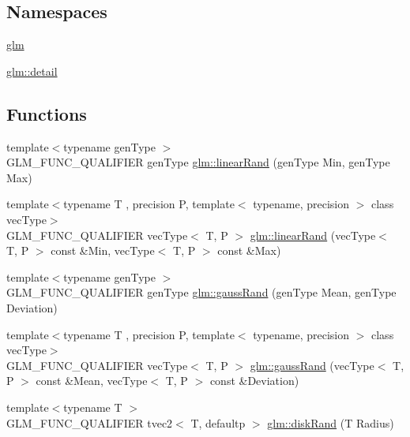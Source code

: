 \subsection*{Namespaces}
\begin{DoxyCompactItemize}
\item 
 \hyperlink{namespaceglm}{glm}
\item 
 \hyperlink{namespaceglm_1_1detail}{glm\+::detail}
\end{DoxyCompactItemize}
\subsection*{Functions}
\begin{DoxyCompactItemize}
\item 
{\footnotesize template$<$typename gen\+Type $>$ }\\G\+L\+M\+\_\+\+F\+U\+N\+C\+\_\+\+Q\+U\+A\+L\+I\+F\+I\+E\+R gen\+Type \hyperlink{namespaceglm_ad60fbcaa8da896b6f2cdd0aa302b96a4}{glm\+::linear\+Rand} (gen\+Type Min, gen\+Type Max)
\item 
{\footnotesize template$<$typename T , precision P, template$<$ typename, precision $>$ class vec\+Type$>$ }\\G\+L\+M\+\_\+\+F\+U\+N\+C\+\_\+\+Q\+U\+A\+L\+I\+F\+I\+E\+R vec\+Type$<$ T, P $>$ \hyperlink{group__gtc__random_gaba9cec867916d894d794a32897b7fdfd}{glm\+::linear\+Rand} (vec\+Type$<$ T, P $>$ const \&Min, vec\+Type$<$ T, P $>$ const \&Max)
\item 
{\footnotesize template$<$typename gen\+Type $>$ }\\G\+L\+M\+\_\+\+F\+U\+N\+C\+\_\+\+Q\+U\+A\+L\+I\+F\+I\+E\+R gen\+Type \hyperlink{group__gtc__random_ga5193a83e49e4fdc5652c084711083574}{glm\+::gauss\+Rand} (gen\+Type Mean, gen\+Type Deviation)
\item 
{\footnotesize template$<$typename T , precision P, template$<$ typename, precision $>$ class vec\+Type$>$ }\\G\+L\+M\+\_\+\+F\+U\+N\+C\+\_\+\+Q\+U\+A\+L\+I\+F\+I\+E\+R vec\+Type$<$ T, P $>$ \hyperlink{namespaceglm_adc010d4dd74cff264ee912f72de1adb9}{glm\+::gauss\+Rand} (vec\+Type$<$ T, P $>$ const \&Mean, vec\+Type$<$ T, P $>$ const \&Deviation)
\item 
{\footnotesize template$<$typename T $>$ }\\G\+L\+M\+\_\+\+F\+U\+N\+C\+\_\+\+Q\+U\+A\+L\+I\+F\+I\+E\+R tvec2$<$ T, defaultp $>$ \hyperlink{group__gtc__random_gad3a3ee7d26502a31ba552cb627a68606}{glm\+::disk\+Rand} (T Radius)
\item 

\end{DoxyCompactItemize}
